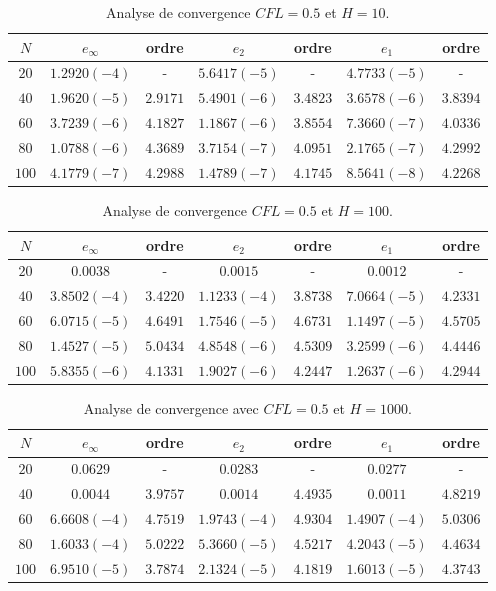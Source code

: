 \begin{table}%
\begin{tabular}{c|c|c|c|c|c|c}
$N$ & $e_{\infty}$ & ordre & $e_2$ & ordre & $e_1$ & ordre \\ 
\hline 
\hline
$20$ & $1.2920 (-4)$ & - & $5.6417 (-5)$ & - & $4.7733 (-5)$ & - \\ 
\hline 
$40$ & $1.9620 (-5)$ & $2.9171$ & $5.4901 (-6)$ & $3.4823$ & $3.6578 (-6)$ & $3.8394$ \\ 
\hline 
$60$ & $3.7239 (-6)$ & $4.1827$ & $1.1867 (-6)$ & $3.8554$ & $7.3660 (-7)$ & $4.0336$ \\
\hline 
$80$ & $1.0788 (-6)$ & $4.3689$ & $3.7154 (-7)$ & $4.0951$ & $2.1765 (-7)$ & $4.2992$ \\ 
\hline 
$100$ & $4.1779(-7)$ & $4.2988$ & $1.4789 (-7)$ & $4.1745$ & $8.5641 (-8)$ & $4.2268$  \\ 
\end{tabular} 
\caption{Analyse de convergence $CFL=0.5$ et $H=10$.}
\label{CV_order4_hp10}
\end{table}

\begin{table}%
\begin{tabular}{c|c|c|c|c|c|c}
$N$ & $e_{\infty}$ & ordre & $e_2$ & ordre & $e_1$ & ordre \\ 
\hline 
\hline
$20$ & $0.0038$ & - & $0.0015$ & - & $0.0012$ & - \\ 
\hline 
$40$ & $3.8502 (-4)$ & $3.4220$ & $1.1233 (-4)$ & $3.8738$ & $7.0664 (-5)$ & $4.2331$ \\ 
\hline 
$60$ & $6.0715 (-5)$ & $4.6491$ & $1.7546 (-5)$ & $4.6731$ & $1.1497 (-5)$ & $4.5705$ \\
\hline 
$80$ & $1.4527 (-5)$ & $5.0434$ & $4.8548 (-6)$ & $4.5309$ & $3.2599 (-6)$ & $4.4446$ \\ 
\hline 
$100$ & $5.8355(-6)$ & $4.1331$ & $1.9027 (-6)$ & $4.2447$ & $1.2637 (-6)$ & $4.2944$  \\ 
\end{tabular} 
\caption{Analyse de convergence $CFL=0.5$ et $H=100$.}
\label{CV_order4_hp100}
\end{table}

\begin{table}%
\begin{tabular}{c|c|c|c|c|c|c}
$N$ & $e_{\infty}$ & ordre & $e_2$ & ordre & $e_1$ & ordre \\ 
\hline 
\hline
$20$ & $0.0629$ & - & $0.0283$ & - & $0.0277$ & - \\ 
\hline 
$40$ & $0.0044$ & $3.9757$ & $0.0014$ & $4.4935$ & $0.0011$ & $4.8219$ \\ 
\hline 
$60$ & $6.6608 (-4)$ & $4.7519$ & $1.9743 (-4)$ & $4.9304$ & $1.4907 (-4)$ & $5.0306$ \\
\hline 
$80$ & $1.6033 (-4)$ & $5.0222$ & $5.3660 (-5)$ & $4.5217$ & $4.2043 (-5)$ & $4.4634$ \\ 
\hline 
$100$ & $6.9510(-5)$ & $3.7874$ & $2.1324 (-5)$ & $4.1819$ & $1.6013 (-5)$ & $4.3743$  \\ 
\end{tabular} 
\caption{Analyse de convergence avec $CFL=0.5$ et $H=1000$.}
\label{CV_order4_hp1000}
\end{table}

